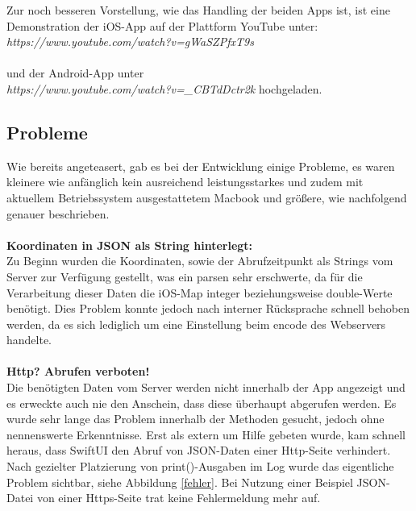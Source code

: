 Zur noch besseren Vorstellung, wie das Handling der beiden Apps ist, ist eine Demonstration der iOS-App  auf der Plattform YouTube  unter: 
\\
\textit{https://www.youtube.com/watch?v=gWaSZPfxT9s} 
\\
\\
und der Android-App unter 
\\
\textit{https://www.youtube.com/watch?v=\_CBTdDctr2k} hochgeladen.

\subsection{Probleme}
Wie bereits angeteasert, gab es bei der Entwicklung einige Probleme, es waren kleinere wie anfänglich kein ausreichend leistungsstarkes und zudem mit aktuellem Betriebssystem ausgestattetem Macbook und größere, wie nachfolgend genauer beschrieben.
\\
\\
\textbf{Koordinaten in JSON als String hinterlegt:}
\\
Zu Beginn wurden die Koordinaten, sowie der Abrufzeitpunkt als Strings vom Server zur Verfügung gestellt, was ein parsen sehr erschwerte, da für die Verarbeitung dieser Daten die iOS-Map integer beziehungsweise double-Werte benötigt. Dies Problem konnte jedoch nach interner Rücksprache schnell behoben werden, da es sich lediglich um eine Einstellung beim encode des Webservers handelte.
\\
\\
\textbf{Http? Abrufen verboten!}
\\
Die benötigten Daten vom Server werden nicht innerhalb der App angezeigt und es erweckte auch nie den Anschein, dass diese überhaupt abgerufen werden. Es wurde sehr lange das Problem innerhalb der Methoden gesucht, jedoch ohne nennenswerte Erkenntnisse. Erst als extern um Hilfe gebeten wurde, kam schnell heraus, dass SwiftUI den Abruf von JSON-Daten einer Http-Seite verhindert. Nach gezielter Platzierung von print()-Ausgaben im Log wurde das eigentliche Problem sichtbar, siehe Abbildung \ref{fehler}. Bei Nutzung einer Beispiel JSON-Datei von einer Https-Seite trat keine Fehlermeldung mehr auf.
